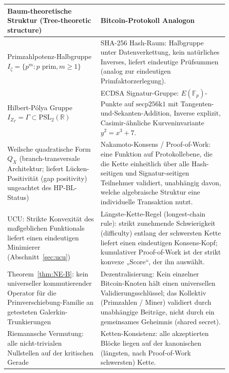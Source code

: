 \documentclass[11pt]{article}
\theoremstyle{definition}
\theoremstyle{remark}
\newcommand{\HBL}{\mathrm{HP\text{-}BL}}
\newcommand{\PSL}{\mathrm{PSL}}
\begin{document}
\begin{center}
\renewcommand{\arraystretch}{1.25}
\begin{tabular}{@{}p{0.38\linewidth} p{0.52\linewidth}@{}}
\toprule
\textbf{Baum-theoretische Struktur (Tree-theoretic structure)} & \textbf{Bitcoin-Protokoll Analogon} \\
\midrule
Primzahlpotenz-Halbgruppe
  $I_\zeta = \{p^m : p \text{ prim}, m \geq 1\}$ &
SHA-256 Hash-Raum: Halbgruppe unter Datenverkettung, kein
natürliches Inverses, liefert eindeutige Prüfsummen (analog zur eindeutigen Primfaktorzerlegung). \\[0.4ex]

Hilbert-P\'olya Gruppe
  $I_{Z_\Gamma} = \Gamma \subset \PSL_2(\mathbb{R})$ &
ECDSA Signatur-Gruppe: $E(\mathbb{F}_p)$-Punkte auf
$\mathrm{secp256k1}$ mit Tangenten-und-Sekanten-Addition, Inverse
explizit, Casimir-ähnliche Kurveninvariante $y^2 = x^3 + 7$. \\[0.4ex]

Weilsche quadratische Form $Q_X$ (branch-transversale Architektur; liefert
Lücken-Positivität (gap positivity) ungeachtet des $\HBL$-Status) &
Nakamoto-Konsens / Proof-of-Work: eine Funktion auf Protokollebene, die
die Kette einheitlich über alle Hash-seitigen und Signatur-seitigen
Teilnehmer validiert, unabhängig davon, welche algebraische Struktur
eine individuelle Transaktion nutzt. \\[0.4ex]

UCU: Strikte Konvexität des maßgeblichen Funktionals liefert einen
eindeutigen Minimierer (Abschnitt~\ref{sec:ucu}) &
Längste-Kette-Regel (longest-chain rule): strikt zunehmende Schwierigkeit (difficulty) entlang der schwersten
Kette liefert einen eindeutigen Konsens-Kopf; kumulativer Proof-of-Work ist
der strikt konvexe „Score“, der ihn auswählt. \\[0.4ex]

Theorem~\ref{thm:NE-B}: kein universeller kommutierender Operator für die
Primverschiebung-Familie an getesteten Galerkin-Trunkierungen &
Dezentralisierung: Kein einzelner Bitcoin-Knoten hält einen universellen Validierungsschlüssel;
das Kollektiv (Primzahlen / Miner) validiert durch unabhängige
Beiträge, nicht durch ein gemeinsames Geheimnis (shared secret). \\[0.4ex]

Riemannsche Vermutung: alle nicht-trivialen Nullstellen auf der kritischen Gerade &
Ketten-Konsistenz: alle akzeptierten Blöcke liegen auf der kanonischen
(längsten, nach Proof-of-Work schwersten) Kette. \\[0.4ex]


\end{tabular}
\end{center}
\end{document}
